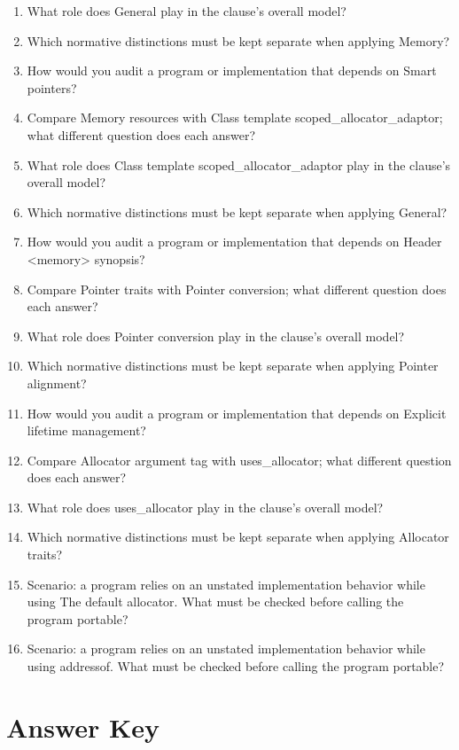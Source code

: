 \documentclass[11pt,letterpaper]{article}
\begin{document}
\begin{enumerate}
\item What role does General play in the clause's overall model?
\item Which normative distinctions must be kept separate when applying Memory?
\item How would you audit a program or implementation that depends on Smart pointers?
\item Compare Memory resources with Class template scoped\_\allowbreak{}allocator\_\allowbreak{}adaptor; what different question does each answer?
\item What role does Class template scoped\_\allowbreak{}allocator\_\allowbreak{}adaptor play in the clause's overall model?
\item Which normative distinctions must be kept separate when applying General?
\item How would you audit a program or implementation that depends on Header <memory> synopsis?
\item Compare Pointer traits with Pointer conversion; what different question does each answer?
\item What role does Pointer conversion play in the clause's overall model?
\item Which normative distinctions must be kept separate when applying Pointer alignment?
\item How would you audit a program or implementation that depends on Explicit lifetime management?
\item Compare Allocator argument tag with uses\_\allowbreak{}allocator; what different question does each answer?
\item What role does uses\_\allowbreak{}allocator play in the clause's overall model?
\item Which normative distinctions must be kept separate when applying Allocator traits?
\item Scenario: a program relies on an unstated implementation behavior while using The default allocator. What must be checked before calling the program portable?
\item Scenario: a program relies on an unstated implementation behavior while using addressof. What must be checked before calling the program portable?
\end{enumerate}
\clearpage\section{Answer Key}
\end{document}
